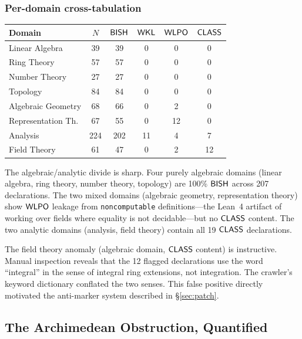 \subsubsection{Per-domain cross-tabulation}\label{sec:per-domain}

\begin{center}
\small
\begin{tabular}{lccccc}
\toprule
\textbf{Domain} & \textbf{$N$} & \textbf{$\textsf{BISH}$} & \textbf{$\textsf{WKL}$}
  & \textbf{$\textsf{WLPO}$} & \textbf{$\textsf{CLASS}$} \\
\midrule
Linear Algebra     & 39  & 39  &  0 &  0 &  0 \\
Ring Theory        & 57  & 57  &  0 &  0 &  0 \\
Number Theory      & 27  & 27  &  0 &  0 &  0 \\
Topology           & 84  & 84  &  0 &  0 &  0 \\
Algebraic Geometry & 68  & 66  &  0 &  2 &  0 \\
Representation Th. & 67  & 55  &  0 & 12 &  0 \\
Analysis           & 224 & 202 & 11 &  4 &  7 \\
Field Theory       & 61  & 47  &  0 &  2 & 12 \\
\bottomrule
\end{tabular}
\end{center}

The algebraic/analytic divide is sharp.  Four purely algebraic domains
(linear algebra, ring theory, number theory, topology) are 100\%
$\textsf{BISH}$ across 207 declarations.  The two mixed domains (algebraic
geometry, representation theory) show $\textsf{WLPO}$ leakage from
\texttt{noncomputable} definitions---the Lean~4 artifact of working
over fields where equality is not decidable---but no $\textsf{CLASS}$ content.
The two analytic domains (analysis, field theory) contain all 19
$\textsf{CLASS}$ declarations.

The field theory anomaly (algebraic domain, $\textsf{CLASS}$ content) is
instructive.  Manual inspection reveals that the 12 flagged
declarations use the word ``integral'' in the sense of integral ring
extensions, not integration.  The crawler's keyword dictionary
conflated the two senses.  This false positive directly motivated the
anti-marker system described in \S\ref{sec:patch}.


\subsection{The Archimedean Obstruction, Quantified}\label{part:archimedean}

